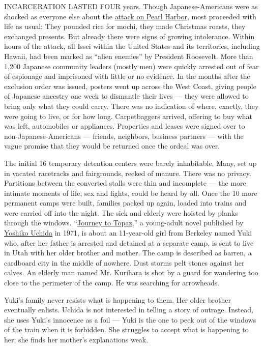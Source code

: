 INCARCERATION LASTED FOUR years. Though Japanese-Americans were as
shocked as everyone else about the
\href{https://www.nytimes3xbfgragh.onion/2016/12/07/world/pearl-harbor-anniversary.html}{attack
on Pearl Harbor}, most proceeded with life as usual: They pounded rice
for mochi, they made Christmas roasts, they exchanged presents. But
already there were signs of growing intolerance. Within hours of the
attack, all Issei within the United States and its territories,
including Hawaii, had been marked as ``alien enemies'' by President
Roosevelt. More than 1,200 Japanese community leaders (mostly men) were
quickly arrested out of fear of espionage and imprisoned with little or
no evidence. In the months after the exclusion order was issued, posters
went up across the West Coast, giving people of Japanese ancestry one
week to dismantle their lives --- they were allowed to bring only what
they could carry. There was no indication of where, exactly, they were
going to live, or for how long. Carpetbaggers arrived, offering to buy
what was left, automobiles or appliances. Properties and leases were
signed over to non-Japanese-Americans --- friends, neighbors, business
partners --- with the vague promise that they would be returned once the
ordeal was over.

The initial 16 temporary detention centers were barely inhabitable.
Many, set up in vacated racetracks and fairgrounds, reeked of manure.
There was no privacy. Partitions between the converted stalls were thin
and incomplete --- the more intimate moments of life, sex and fights,
could be heard by all. Once the 10 more permanent camps were built,
families packed up again, loaded into trains and were carried off into
the night. The sick and elderly were hoisted by planks through the
windows.
``\href{https://www.scholastic.com/teachers/books/journey-to-topaz-by-yoshiko-uchida/}{Journey
to Topaz},'' a young-adult novel published by
\href{https://www.nytimes3xbfgragh.onion/1992/06/24/obituaries/yoshiko-uchida-70-a-children-s-author.html}{Yoshiko
Uchida} in 1971, is about an 11-year-old girl from Berkeley named Yuki
who, after her father is arrested and detained at a separate camp, is
sent to live in Utah with her older brother and mother. The camp is
described as barren, a cardboard city in the middle of nowhere. Dust
storms pelt stones against her calves. An elderly man named Mr. Kurihara
is shot by a guard for wandering too close to the perimeter of the camp.
He was searching for arrowheads.

Yuki's family never resists what is happening to them. Her older brother
eventually enlists. Uchida is not interested in telling a story of
outrage. Instead, she uses Yuki's innocence as a foil --- Yuki is the
one to peek out of the windows of the train when it is forbidden. She
struggles to accept what is happening to her; she finds her mother's
explanations weak.

